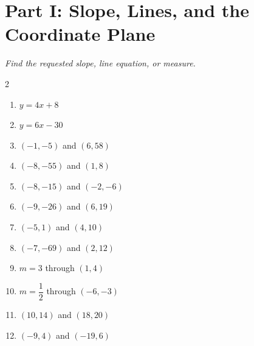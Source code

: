 \documentclass[11pt]{article}
\begin{document}
\section*{Part I: Slope, Lines, and the Coordinate Plane}
\noindent\textit{Find the requested slope, line equation, or measure.}
\begin{multicols}{2}
\begin{enumerate}
  \item $y = 4x + 8$
  \vspace{1.7cm}
  \item $y = 6x - 30$
  \vspace{1.7cm}
  \item $(-1, -5)$ and $(6, 58)$
  \vspace{1.7cm}
  \item $(-8, -55)$ and $(1, 8)$
  \vspace{1.7cm}
  \item $(-8, -15)$ and $(-2, -6)$
  \vspace{1.7cm}
  \item $(-9, -26)$ and $(6, 19)$
  \vspace{1.7cm}
  \item $(-5, 1)$ and $(4, 10)$
  \vspace{1.7cm}
  \item $(-7, -69)$ and $(2, 12)$
  \vspace{1.7cm}
  \item $m = 3$ through $(1, 4)$
  \vspace{1.7cm}
  \item $m = \dfrac{1}{2}$ through $(-6, -3)$
  \vspace{1.7cm}
  \item $(10, 14)$ and $(18, 20)$
  \vspace{1.7cm}
  \item $(-9, 4)$ and $(-19, 6)$
  \vspace{1.7cm}
\end{enumerate}
\end{multicols}
\end{document}
